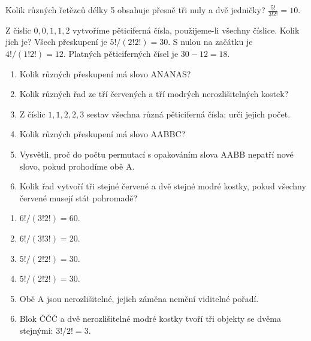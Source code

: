 \documentclass[11pt,a4paper]{article}
\begin{document}
\begin{zadaniReseniBox}[title={Samostatná práce 3}]
Kolik různých řetězců délky 5 obsahuje přesně tři nuly a dvě jedničky?
\tcblower
$\frac{5!}{3!2!}=10$.
\end{zadaniReseniBox}




\begin{zadaniReseniBox}[title={Rozšíření 1}]
Z číslic $0,0,1,1,2$ vytvoříme pěticiferná čísla, použijeme-li všechny číslice. Kolik jich je?
\tcblower
Všech přeskupení je $5!/(2!2!)=30$. S nulou na začátku je $4!/(1!2!)=12$. Platných pěticiferných čísel je $30-12=18$.
\end{zadaniReseniBox}





\begin{zadaniReseniBox}[title={Domácí úkol}]

\begin{enumerate}[label=\alph*),leftmargin=*,itemsep=2pt]

\item Kolik různých přeskupení má slovo ANANAS?
\item Kolik různých řad ze tří červených a tří modrých nerozlišitelných kostek?
\item Z číslic $1,1,2,2,3$ sestav všechna různá pěticiferná čísla; urči jejich počet.
\item Kolik různých přeskupení má slovo AABBC?
\item Vysvětli, proč do počtu permutací s opakováním slova AABB nepatří nové slovo, pokud prohodíme obě A.
\item Kolik řad vytvoří tři stejné červené a dvě stejné modré kostky, pokud všechny červené musejí stát pohromadě?

\end{enumerate}

\tcblower

\begin{enumerate}[label=\alph*),leftmargin=*,itemsep=2pt]

\item $6!/(3!2!)=60$.
\item $6!/(3!3!)=20$.
\item $5!/(2!2!)=30$.
\item $5!/(2!2!)=30$.
\item Obě A jsou nerozlišitelné, jejich záměna nemění viditelné pořadí.
\item Blok ČČČ a dvě nerozlišitelné modré kostky tvoří tři objekty se dvěma stejnými: $3!/2!=3$.

\end{enumerate}

\end{zadaniReseniBox}


\end{document}
